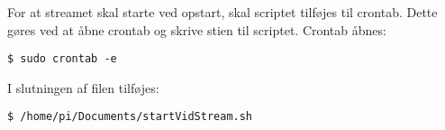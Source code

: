 For at streamet skal starte ved opstart, skal scriptet tilføjes til crontab. Dette gøres ved at åbne crontab og skrive stien til scriptet. Crontab åbnes:
\begin{lstlisting}
$ sudo crontab -e
\end{lstlisting}
I slutningen af filen tilføjes:
\begin{lstlisting}
$ /home/pi/Documents/startVidStream.sh
\end{lstlisting}


















